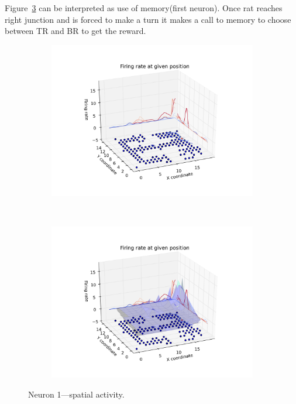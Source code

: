 \documentclass[12pt,a4paper,twocolumn]{article}
\begin{document}
Figure~\ref{fig:3d_n1} can be interpreted as use of memory(first neuron). Once rat reaches right junction and is forced to make a turn it makes a call to memory to choose between TR and BR to get the reward.\\

\begin{figure}[htbp]
  \begin{subfigure}{.99\linewidth}\centering
    \includegraphics[width=1.1\textwidth]{figure6_a.png}
    \caption{\label{fig:3d_n1_a}}
  \end{subfigure}\\[1ex]
  \begin{subfigure}{.99\linewidth}\centering
    \includegraphics[width=1.1\textwidth]{figure6_b.png}
    \caption{\label{fig:3d_n1_b}}
  \end{subfigure}

  \caption{Neuron 1---spatial activity.\label{fig:3d_n1}}
\end{figure}
\end{document}
